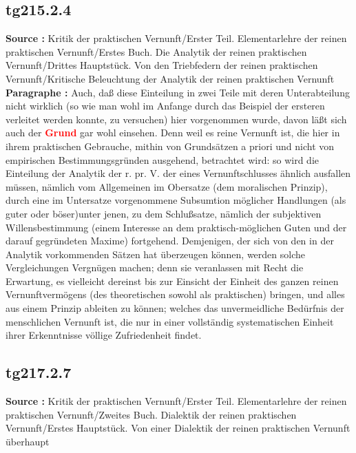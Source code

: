 \documentclass[a4paper,12pt,twoside]{book}
\newcommand{\match}[1]{\textcolor{red}{\textbf{#1}}}
\begin{document}
	\subsection*{tg215.2.4} 
	\textbf{Source : }Kritik der praktischen Vernunft/Erster Teil. Elementarlehre der reinen praktischen Vernunft/Erstes Buch. Die Analytik der reinen praktischen Vernunft/Drittes Hauptstück. Von den Triebfedern der reinen praktischen Vernunft/Kritische Beleuchtung der Analytik der reinen praktischen Vernunft\\  
	
	\noindent\textbf{Paragraphe : }Auch, daß diese Einteilung in zwei Teile mit deren Unterabteilung nicht wirklich (so wie man wohl im Anfange durch das Beispiel der ersteren verleitet werden konnte, zu versuchen) hier vorgenommen wurde, davon läßt sich auch der \match{Grund} gar wohl einsehen. Denn weil es reine Vernunft ist, die hier in ihrem praktischen Gebrauche, mithin von Grundsätzen a priori und nicht von empirischen Bestimmungsgründen ausgehend, betrachtet wird: so wird die Einteilung der Analytik der r. pr. V. der eines Vernunftschlusses ähnlich ausfallen müssen, nämlich vom Allgemeinen im Obersatze (dem moralischen Prinzip), durch eine im Untersatze vorgenommene Subsumtion möglicher Handlungen (als guter oder böser)unter jenen, zu dem Schlußsatze, nämlich der subjektiven Willensbestimmung (einem Interesse an dem praktisch-möglichen Guten und der darauf gegründeten Maxime) fortgehend. Demjenigen, der sich von den in der Analytik vorkommenden Sätzen hat überzeugen können, werden solche Vergleichungen Vergnügen machen; denn sie veranlassen mit Recht die Erwartung, es vielleicht dereinst bis zur Einsicht der Einheit des ganzen reinen Vernunftvermögens (des theoretischen sowohl als praktischen)  bringen, und alles aus einem Prinzip ableiten zu können; welches das unvermeidliche Bedürfnis der menschlichen Vernunft ist, die nur in einer vollständig systematischen Einheit ihrer Erkenntnisse völlige Zufriedenheit findet. 
	
	\subsection*{tg217.2.7} 
	\textbf{Source : }Kritik der praktischen Vernunft/Erster Teil. Elementarlehre der reinen praktischen Vernunft/Zweites Buch. Dialektik der reinen praktischen Vernunft/Erstes Hauptstück. Von einer Dialektik der reinen praktischen Vernunft überhaupt\\  
	
\end{document}

